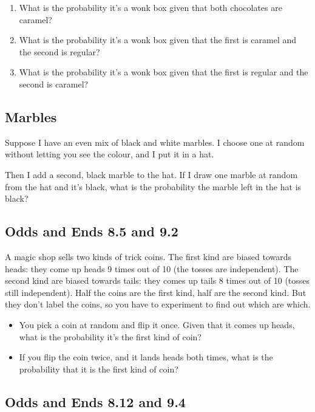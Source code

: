 \documentclass[
  11pt,
]{article}
\providecommand{\tightlist}{%
  \setlength{\itemsep}{0pt}\setlength{\parskip}{0pt}}
\begin{document}
\begin{enumerate}
\def\labelenumi{\alph{enumi}.}
\tightlist
\item
  What is the probability it's a wonk box given that both chocolates are
  caramel?
\item
  What is the probability it's a wonk box given that the first is
  caramel and the second is regular?
\item
  What is the probability it's a wonk box given that the first is
  regular and the second is caramel?
\end{enumerate}

\hypertarget{marbles}{%
\subsection{Marbles}\label{marbles}}

Suppose I have an even mix of black and white marbles. I choose one at
random without letting you see the colour, and I put it in a hat.

Then I add a second, black marble to the hat. If I draw one marble at
random from the hat and it's black, what is the probability the marble
left in the hat is black?

\hypertarget{odds-and-ends-8.5-and-9.2}{%
\subsection{Odds and Ends 8.5 and 9.2}\label{odds-and-ends-8.5-and-9.2}}

A magic shop sells two kinds of trick coins. The first kind are biased
towards heads: they come up heads 9 times out of 10 (the tosses are
independent). The second kind are biased towards tails: they comes up
tails 8 times out of 10 (tosses still independent). Half the coins are
the first kind, half are the second kind. But they don't label the
coins, so you have to experiment to find out which are which.

\begin{itemize}
\tightlist
\item
  You pick a coin at random and flip it once. Given that it comes up
  heads, what is the probability it's the first kind of coin?
\item
  If you flip the coin twice, and it lands heads both times, what is the
  probability that it is the first kind of coin?
\end{itemize}

\hypertarget{odds-and-ends-8.12-and-9.4}{%
\subsection{Odds and Ends 8.12 and
9.4}\label{odds-and-ends-8.12-and-9.4}}
\end{document}
